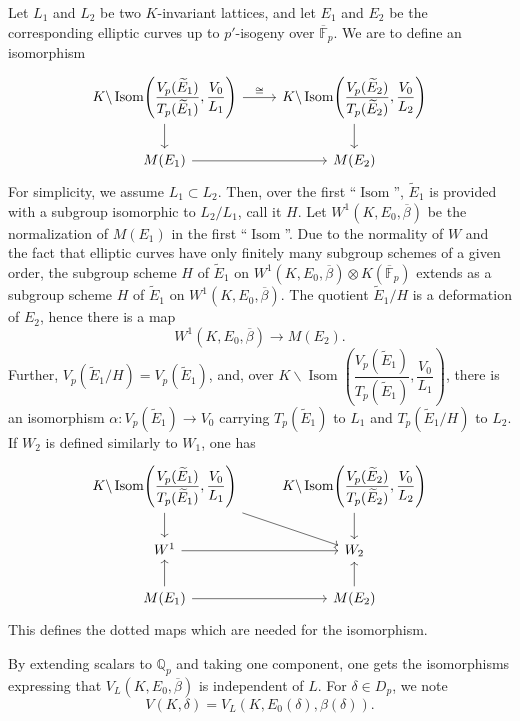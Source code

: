 \documentclass[11pt,a4paper]{article}
\theoremstyle{plain}
\theoremstyle{definition}
\theoremstyle{remark}
\DeclareMathOperator{\Isom}{Isom}
\newcommand{\Fpbar}{\overline{\mathbb{F}}_{p}}
\newcommand{\Qp}{\mathbb{Q}_{p}}
\newcommand{\Vp}{V_{p}}
\newcommand{\Tp}{T_{p}}
\begin{document}
Let $L_{1}$ and $L_{2}$ be two $K$-invariant lattices, and let $E_{1}$ and $E_{2}$ be the corresponding elliptic curves up to $p'$-isogeny over $\Fpbar$. We are to define an isomorphism
\[
\begin{tikzcd}
K \backslash \Isom\!\left(\dfrac{\Vp(\widetilde{E}_{1})}{\Tp(\widetilde{E}_{1})}, \dfrac{V_{0}}{L_{1}}\right) \arrow[d] \arrow[r, "\cong"] & K \backslash \Isom\!\left(\dfrac{\Vp(\widetilde{E}_{2})}{\Tp(\widetilde{E}_{2})}, \dfrac{V_{0}}{L_{2}}\right) \arrow[d] \\
M(E_{1}) \arrow[r] & M(E_{2})
\end{tikzcd}
\]
For simplicity, we assume $L_{1} \subset L_{2}$. Then, over the first ``$\Isom$'', $\widetilde{E}_{1}$ is provided with a subgroup isomorphic to $L_{2}/L_{1}$, call it $H$. Let $W^{1}(K, E_{0}, \overline{\beta})$ be the normalization of $M(E_{1})$ in the first ``$\Isom$''. Due to the normality of $W$ and the fact that elliptic curves have only finitely many subgroup schemes of a given order, the subgroup scheme $H$ of $\widetilde{E}_{1}$ on $W^{1}(K, E_{0}, \overline{\beta}) \otimes K(\Fpbar)$ extends as a subgroup scheme $H$ of $\widetilde{E}_{1}$ on $W^{1}(K, E_{0}, \overline{\beta})$. The quotient $\widetilde{E}_{1}/H$ is a deformation of $E_{2}$, hence there is a map
\[
W^{1}(K, E_{0}, \overline{\beta}) \to M(E_{2}).
\]
Further, $\Vp(\widetilde{E}_{1}/H) = \Vp(\widetilde{E}_{1})$, and, over $K \backslash \Isom\!\left(\dfrac{\Vp(\widetilde{E}_{1})}{\Tp(\widetilde{E}_{1})}, \dfrac{V_{0}}{L_{1}}\right)$, there is an isomorphism $\alpha : \Vp(\widetilde{E}_{1}) \to V_{0}$ carrying $\Tp(\widetilde{E}_{1})$ to $L_{1}$ and $\Tp(\widetilde{E}_{1}/H)$ to $L_{2}$. If $W_{2}$ is defined similarly to $W_{1}$, one has
\[
\begin{tikzcd}
K \backslash \Isom\!\left(\dfrac{\Vp(\widetilde{E}_{1})}{\Tp(\widetilde{E}_{1})}, \dfrac{V_{0}}{L_{1}}\right) \arrow[d] \arrow[dr] & K \backslash \Isom\!\left(\dfrac{\Vp(\widetilde{E}_{2})}{\Tp(\widetilde{E}_{2})}, \dfrac{V_{0}}{L_{2}}\right) \arrow[d] \\
W^{1} \arrow[r] & W_{2} \\
M(E_{1}) \arrow[u] \arrow[r] & M(E_{2}) \arrow[u]
\end{tikzcd}
\]
This defines the dotted maps which are needed for the isomorphism.

By extending scalars to $\Qp$ and taking one component, one gets the isomorphisms expressing that $V_{L}(K, E_{0}, \overline{\beta})$ is independent of $L$. For $\delta \in D_{p}$, we note
\[
V(K, \delta) = V_{L}(K, E_{0}(\delta), \beta(\delta)).
\]
\end{document}
